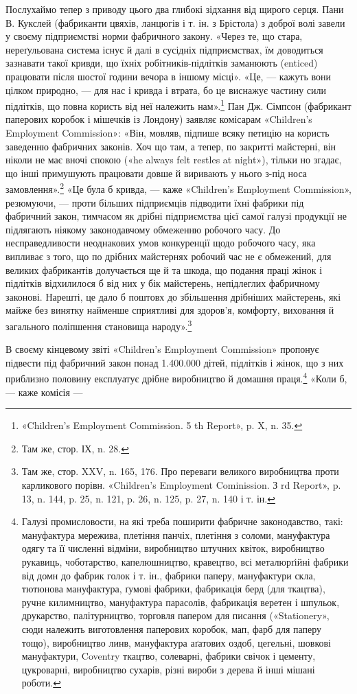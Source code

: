 Послухаймо тепер з приводу цього два глибокі зідхання від щирого серця. Пани В. Кукслей (фабриканти
цвяхів, ланцюгів і т. ін. з Брістола) з доброї волі завели у своєму підприємстві норми фабричного
закону. «Через те, що стара, нереґульована система існує й далі в сусідніх підприємствах, їм
доводиться зазнавати такої кривди, що їхніх робітників-підлітків заманюють (enticed) працювати після
шостої години вечора в іншому місці». «Це, — кажуть вони цілком природно, — для нас і кривда і
втрата, бо це виснажує частину сили підлітків, що повна користь від неї належить нам».\footnote{
«Children's Employment Commission. 5 th Report», p. X, n. 35.
} Пан Дж.
Сімпсон (фабрикант паперових коробок і мішечків із Лондону) заявляє комісарам «Children’s Employment
Commission»: «Він, мовляв, підпише всяку петицію на користь заведенню фабричних законів. Хоч що там,
а тепер, по закритті майстерні, він ніколи не має вночі спокою («he always felt restles at night»),
тільки но згадає, що інші примушують працювати довше й виривають у нього з-під носа замовлення».\footnote{
Там же, стор. ІХ, n. 28.
}
«Це була б кривда, — каже «Children’s Employment Commission», резюмуючи, — проти більших підприємців
підводити їхні фабрики під фабричний закон, тимчасом як дрібні підприємства цієї самої галузі
продукції не підлягають ніякому законодавчому обмеженню робочого часу. До несправедливости
неоднакових умов конкуренції щодо робочого часу, яка випливає з того, що по дрібних майстернях
робочий час не є обмежений, для великих фабрикантів долучається ще й та шкода, що подання праці
жінок і підлітків відхилилося б від них у бік майстерень, непідлеглих фабричному законові. Нарешті,
це дало б поштовх до збільшення дрібніших майстерень, які майже без винятку найменше сприятливі для
здоров’я, комфорту, виховання й загального поліпшення становища народу».\footnote{
Там же, стор. XXV, n. 165, 176. Про переваги великого виробництва проти карликового порівн.
«Children’s Employment Cominission. З rd Report», p. 13, n. 144, p. 25, n. 121, p. 26, n. 125, p.
27, n. 140 і т. ін.
}

В своєму кінцевому звіті «Children’s Employment Commission» пропонує підвести під фабричний закон
понад 1.400.000 дітей, підлітків і жінок, що з них приблизно половину експлуатує дрібне виробництво
й домашня праця.\footnote{
Галузі промисловости, на які треба поширити фабричне законодавство, такі: мануфактура
мережива, плетіння панчіх, плетіння з соломи, мануфактура одягу та її численні відміни, виробництво
штучних квіток, виробництво рукавиць, чоботарство, капелюшництво, кравецтво, всі металюрґійні
фабрики від домн до фабрик голок і т. ін., фабрики паперу, мануфактури скла, тютюнова мануфактура,
ґумові фабрики, фабрикація берд (для ткацтва), ручне килимництво, мануфактура парасолів, фабрикація
веретен і шпульок, друкарство, палітурництво, торговля папером для писання («Stationery», сюди
належить виготовлення паперових коробок, мап, фарб для паперу тощо), виробництво линв, мануфактура
аґатових оздоб, цегельні, шовкові мануфактури, Coventry ткацтво, солеварні, фабрики свічок і
цементу, цукроварні, виробництво сухарів, різні вироби з дерева й інші мішані роботи.
} «Коли б, — каже комісія —